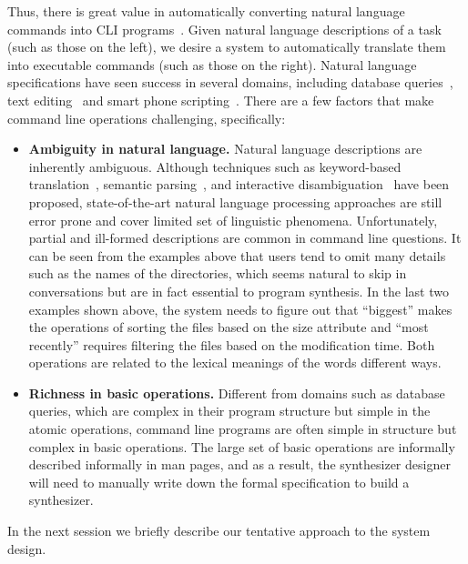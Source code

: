 Thus, there is great value in automatically converting natural language commands into CLI programs~\cite{Pedersen-Report,zoltan1991get,Manaris:1994:DNL:198125.198137}.
Given natural language descriptions of a task (such as those on the left), we desire a system to automatically translate them into executable commands (such as those on the right).
Natural language specifications have seen success in several domains, including database queries~\cite{DBLP:journals/pvldb/LiJ14, DBLP:conf/sigmod/GulwaniM14}, text editing~\cite{DBLP:journals/corr/DesaiGHJKMRR15} and smart phone scripting~\cite{DBLP:conf/mobisys/LeGS13}.
There are a few factors that make command line operations challenging, specifically:
\begin{itemize}
\item \textbf{Ambiguity in natural language.} Natural language descriptions are inherently ambiguous. Although techniques such as keyword-based translation~\cite{DBLP:conf/sigmod/GulwaniM14}, semantic parsing~\citep{Zettlemoyer05learningto}, and interactive disambiguation~\cite{DBLP:journals/pvldb/LiJ14} have been proposed, state-of-the-art natural language processing approaches are still error prone and cover limited set of linguistic phenomena.
Unfortunately, partial and ill-formed descriptions are common in command line questions. It can be seen from the examples above that users tend to omit many details such as the names of the directories, which seems natural to skip in conversations but are in fact essential to program synthesis. In the last two examples shown above, the system needs to figure out that ``biggest'' makes the operations of sorting the files based on the size attribute and ``most recently'' requires filtering the files based on the modification time. Both operations are related to the lexical meanings of the words different ways.

\item \textbf{Richness in basic operations.} Different from domains such as database queries, which are complex in their program structure but simple in the atomic operations, command line programs are often simple in structure but complex in basic operations. The large set of basic operations are informally described informally in man pages, and as a result, the synthesizer designer will need to manually write down the formal specification to build a synthesizer.
\end{itemize}

In the next session we briefly describe our tentative approach to the system design.
